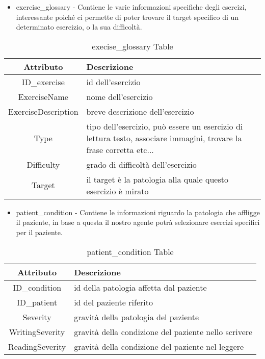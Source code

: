 \documentclass{article}
\begin{document}
\pagebreak

\begin{itemize}
\item     exercise\_glossary - Contiene le varie informazioni specifiche degli esercizi, interessante poiché ci permette di poter trovare il target specifico di un determinato esercizio, o la sua difficoltà.
\end{itemize}

    \begin{table}[h]
        \centering
        \caption{execise\_glossary Table}
        \begin{tabular}{|c|p{8cm}|}
            \hline
            \textbf{Attributo} & \textbf{Descrizione} \\
            \hline
                ID\_exercise & id dell'esercizio\\
            \hline
                ExerciseName & nome dell'esercizio\\
            \hline
                ExerciseDescription & breve descrizione dell'esercizio\\
            \hline
                Type & tipo dell'esercizio, può essere un esercizio di lettura testo, associare immagini, trovare la frase corretta etc...\\
            \hline
                Difficulty & grado di difficoltà dell'esercizio\\
            \hline
                Target & il target è la patologia alla quale questo esercizio è mirato\\
            \hline
        \end{tabular}
    \end{table}

\begin{itemize}
\item     patient\_condition - Contiene le informazioni riguardo la patologia che affligge il paziente, in base a questa il nostro agente potrà selezionare esercizi specifici per il paziente.
\end{itemize}

    \begin{table}[h]
        \centering
        \caption{patient\_condition Table}
        \begin{tabular}{|c|p{8cm}|}
            \hline
            \textbf{Attributo} & \textbf{Descrizione} \\
            \hline
                ID\_condition & id della patologia affetta dal paziente\\
            \hline
                ID\_patient & id del paziente riferito\\
            \hline
                Severity & gravità della patologia del paziente \\
            \hline
                WritingSeverity & gravità della condizione del paziente nello scrivere\\
            \hline
                ReadingSeverity & gravità della condizione del paziente nel leggere\\
            \hline
        \end{tabular}
    \end{table}
\end{document}
